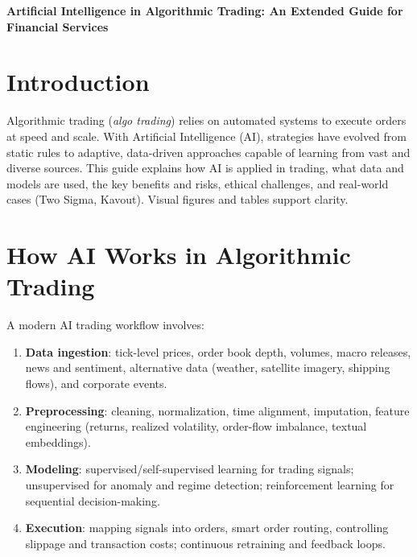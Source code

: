 \documentclass[10pt, a4paper]{article}
\begin{document}
\vspace*{-5em}
\begin{center}
   \LARGE{\textbf{Artificial Intelligence in Algorithmic Trading: 
An Extended Guide for Financial Services}} 
\end{center}

\section*{Introduction}
Algorithmic trading (\emph{algo trading}) relies on automated systems to execute orders at speed and scale. With Artificial Intelligence (AI), strategies have evolved from static rules to adaptive, data-driven approaches capable of learning from vast and diverse sources. This guide explains how AI is applied in trading, what data and models are used, the key benefits and risks, ethical challenges, and real-world cases (Two Sigma, Kavout). Visual figures and tables support clarity.

\section*{How AI Works in Algorithmic Trading}
A modern AI trading workflow involves:
\begin{enumerate}[leftmargin=*,itemsep=2pt]
  \item \textbf{Data ingestion}: tick-level prices, order book depth, volumes, macro releases, news and sentiment, alternative data (weather, satellite imagery, shipping flows), and corporate events.
  \item \textbf{Preprocessing}: cleaning, normalization, time alignment, imputation, feature engineering (returns, realized volatility, order-flow imbalance, textual embeddings).
  \item \textbf{Modeling}: supervised/self-supervised learning for trading signals; unsupervised for anomaly and regime detection; reinforcement learning for sequential decision-making.
  \item \textbf{Execution}: mapping signals into orders, smart order routing, controlling slippage and transaction costs; continuous retraining and feedback loops.
\end{enumerate}
\end{document}
